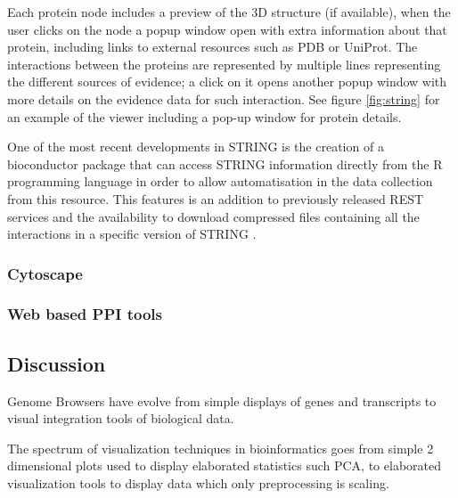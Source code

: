Each protein node includes a preview of the 3D structure (if available), when the user clicks on the node a popup window open with extra information about that protein, including links to external resources such as PDB or UniProt. The interactions between the proteins are represented by multiple lines representing the different sources of evidence; a click on it opens another popup window with more details on the evidence data for such interaction. See figure \ref{fig:string} for an example of the viewer including a pop-up window for protein details.

One of the most recent developments in STRING is the creation of a bioconductor package that can access STRING information directly from the R programming language in order to allow automatisation in the data collection from this resource. This features is an addition to previously released REST services and the availability to download compressed files containing all the interactions in a specific version of STRING \cite{SZK2014}.

\subsubsection{Cytoscape}
\subsubsection{Web based PPI tools}


\subsection{Discussion}
Genome Browsers have evolve from simple displays of genes and transcripts to visual integration tools of biological data.

The spectrum of visualization techniques in bioinformatics goes from simple 2 dimensional plots used to display elaborated statistics such PCA, to elaborated visualization tools to display data which only preprocessing is scaling. 

